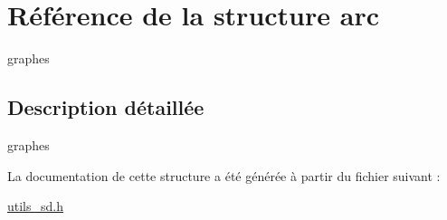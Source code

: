 \hypertarget{structarc}{}\section{Référence de la structure arc}
\label{structarc}


graphes  




\subsection{Description détaillée}
graphes 

La documentation de cette structure a été générée à partir du fichier suivant \+:\begin{DoxyCompactItemize}
\item 
\hyperlink{utils__sd_8h}{utils\+\_\+sd.\+h}\end{DoxyCompactItemize}
